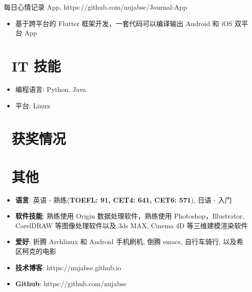 \documentclass{resume}
\begin{document}
\begin{onehalfspacing}
每日心情记录 App, https://github.com/nujabse/Journal-App
\begin{itemize}
  \item 基于跨平台的 Flutter 框架开发，一套代码可以编译输出 Android 和 iOS 双平台 App
\end{itemize}
\end{onehalfspacing}

\section{\faCogs\ IT 技能}
\begin{itemize}[parsep=0.5ex]
  \item 编程语言: Python, Java
  \item 平台: Linux
\end{itemize}

\section{\faHeartO\ 获奖情况}

\section{\faInfo\ 其他}
\begin{itemize}[parsep=0.5ex]
  \item \textbf{语言}: 英语 - 熟练(\textbf{TOEFL: 91,  CET4: 641, CET6: 571}), 日语 - 入门
  \item \textbf{软件技能}: 熟练使用 Origin 数据处理软件，熟练使用 Photoshop，Illustrator, CorelDRAW 等图像处理软件以及 3ds MAX, Cinema 4D 等三维建模渲染软件
  \item \textbf{爱好}: 折腾 Archlinux 和 Android 手机刷机, 倒腾 emacs, 自行车骑行, 以及希区柯克的电影
  \item \textbf{技术博客}: https://nujabse.github.io
  \item \textbf{Github}: https://github.com/nujabse
\end{itemize}

%
%
\end{document}
